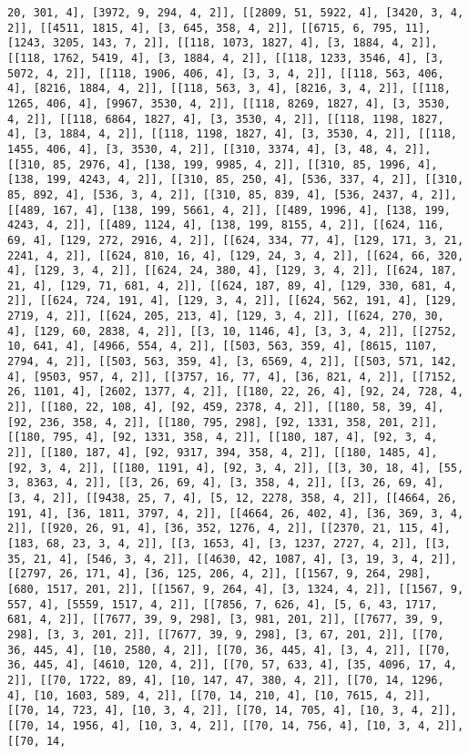 \documentclass[12pt,fleqn]{article}\usepackage{../../common}
\begin{document}
\begin{verbatim}
20, 301, 4], [3972, 9, 294, 4, 2]], [[2809, 51, 5922, 4], [3420, 3, 4, 2]], [[4511, 1815, 4], [3, 645, 358, 4, 2]], [[6715, 6, 795, 11], [1243, 3205, 143, 7, 2]], [[118, 1073, 1827, 4], [3, 1884, 4, 2]], [[118, 1762, 5419, 4], [3, 1884, 4, 2]], [[118, 1233, 3546, 4], [3, 5072, 4, 2]], [[118, 1906, 406, 4], [3, 3, 4, 2]], [[118, 563, 406, 4], [8216, 1884, 4, 2]], [[118, 563, 3, 4], [8216, 3, 4, 2]], [[118, 1265, 406, 4], [9967, 3530, 4, 2]], [[118, 8269, 1827, 4], [3, 3530, 4, 2]], [[118, 6864, 1827, 4], [3, 3530, 4, 2]], [[118, 1198, 1827, 4], [3, 1884, 4, 2]], [[118, 1198, 1827, 4], [3, 3530, 4, 2]], [[118, 1455, 406, 4], [3, 3530, 4, 2]], [[310, 3374, 4], [3, 48, 4, 2]], [[310, 85, 2976, 4], [138, 199, 9985, 4, 2]], [[310, 85, 1996, 4], [138, 199, 4243, 4, 2]], [[310, 85, 250, 4], [536, 337, 4, 2]], [[310, 85, 892, 4], [536, 3, 4, 2]], [[310, 85, 839, 4], [536, 2437, 4, 2]], [[489, 167, 4], [138, 199, 5661, 4, 2]], [[489, 1996, 4], [138, 199, 4243, 4, 2]], [[489, 1124, 4], [138, 199, 8155, 4, 2]], [[624, 116, 69, 4], [129, 272, 2916, 4, 2]], [[624, 334, 77, 4], [129, 171, 3, 21, 2241, 4, 2]], [[624, 810, 16, 4], [129, 24, 3, 4, 2]], [[624, 66, 320, 4], [129, 3, 4, 2]], [[624, 24, 380, 4], [129, 3, 4, 2]], [[624, 187, 21, 4], [129, 71, 681, 4, 2]], [[624, 187, 89, 4], [129, 330, 681, 4, 2]], [[624, 724, 191, 4], [129, 3, 4, 2]], [[624, 562, 191, 4], [129, 2719, 4, 2]], [[624, 205, 213, 4], [129, 3, 4, 2]], [[624, 270, 30, 4], [129, 60, 2838, 4, 2]], [[3, 10, 1146, 4], [3, 3, 4, 2]], [[2752, 10, 641, 4], [4966, 554, 4, 2]], [[503, 563, 359, 4], [8615, 1107, 2794, 4, 2]], [[503, 563, 359, 4], [3, 6569, 4, 2]], [[503, 571, 142, 4], [9503, 957, 4, 2]], [[3757, 16, 77, 4], [36, 821, 4, 2]], [[7152, 26, 1101, 4], [2602, 1377, 4, 2]], [[180, 22, 26, 4], [92, 24, 728, 4, 2]], [[180, 22, 108, 4], [92, 459, 2378, 4, 2]], [[180, 58, 39, 4], [92, 236, 358, 4, 2]], [[180, 795, 298], [92, 1331, 358, 201, 2]], [[180, 795, 4], [92, 1331, 358, 4, 2]], [[180, 187, 4], [92, 3, 4, 2]], [[180, 187, 4], [92, 9317, 394, 358, 4, 2]], [[180, 1485, 4], [92, 3, 4, 2]], [[180, 1191, 4], [92, 3, 4, 2]], [[3, 30, 18, 4], [55, 3, 8363, 4, 2]], [[3, 26, 69, 4], [3, 358, 4, 2]], [[3, 26, 69, 4], [3, 4, 2]], [[9438, 25, 7, 4], [5, 12, 2278, 358, 4, 2]], [[4664, 26, 191, 4], [36, 1811, 3797, 4, 2]], [[4664, 26, 402, 4], [36, 369, 3, 4, 2]], [[920, 26, 91, 4], [36, 352, 1276, 4, 2]], [[2370, 21, 115, 4], [183, 68, 23, 3, 4, 2]], [[3, 1653, 4], [3, 1237, 2727, 4, 2]], [[3, 35, 21, 4], [546, 3, 4, 2]], [[4630, 42, 1087, 4], [3, 19, 3, 4, 2]], [[2797, 26, 171, 4], [36, 125, 206, 4, 2]], [[1567, 9, 264, 298], [680, 1517, 201, 2]], [[1567, 9, 264, 4], [3, 1324, 4, 2]], [[1567, 9, 557, 4], [5559, 1517, 4, 2]], [[7856, 7, 626, 4], [5, 6, 43, 1717, 681, 4, 2]], [[7677, 39, 9, 298], [3, 981, 201, 2]], [[7677, 39, 9, 298], [3, 3, 201, 2]], [[7677, 39, 9, 298], [3, 67, 201, 2]], [[70, 36, 445, 4], [10, 2580, 4, 2]], [[70, 36, 445, 4], [3, 4, 2]], [[70, 36, 445, 4], [4610, 120, 4, 2]], [[70, 57, 633, 4], [35, 4096, 17, 4, 2]], [[70, 1722, 89, 4], [10, 147, 47, 380, 4, 2]], [[70, 14, 1296, 4], [10, 1603, 589, 4, 2]], [[70, 14, 210, 4], [10, 7615, 4, 2]], [[70, 14, 723, 4], [10, 3, 4, 2]], [[70, 14, 705, 4], [10, 3, 4, 2]], [[70, 14, 1956, 4], [10, 3, 4, 2]], [[70, 14, 756, 4], [10, 3, 4, 2]], [[70, 14, 
\end{verbatim}
\end{document}
